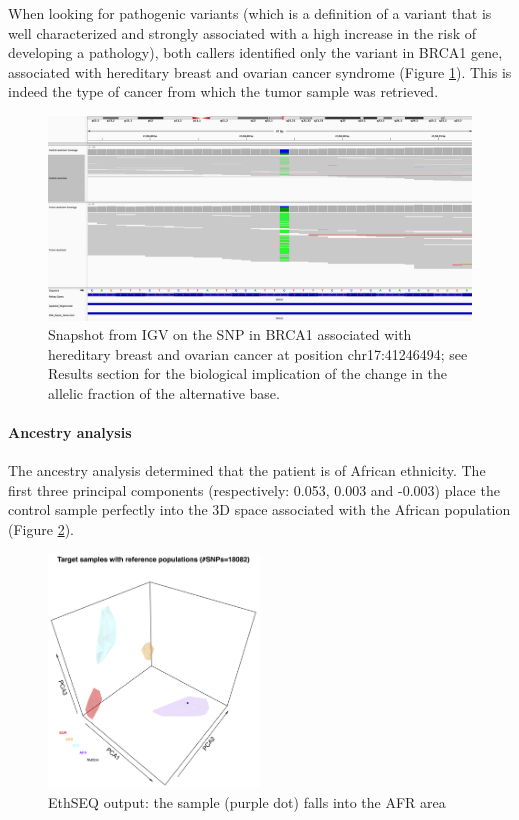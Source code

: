 \documentclass[11pt]{article}
\begin{document}
When looking for pathogenic variants (which is a definition of a variant that is well characterized and strongly associated with a high increase in the risk of developing a pathology), both callers identified only the variant in BRCA1 gene, associated with hereditary breast and ovarian cancer syndrome (Figure \ref{igv_BRCA1}). This is indeed the type of cancer from which the tumor sample was retrieved.

\begin{figure}[H]
   \centering
   \includegraphics[width=\textwidth]{images/BRCA1_snp_het_del.png}
   \caption{\footnotesize{Snapshot from IGV on the SNP in BRCA1 associated with hereditary breast and ovarian cancer at position chr17:41246494; see Results section for the biological implication of the change in the allelic fraction of the alternative base.}}
   \label{igv_BRCA1}
\end{figure}


\paragraph{Ancestry analysis}
The ancestry analysis determined that the patient is of African ethnicity. The first three principal components (respectively: 0.053, 0.003 and -0.003) place the control sample perfectly into the 3D space associated with the African population (Figure \ref{ethSEQ}).

\begin{figure}[H]
   \centering
   \includegraphics[width=0.5\textwidth]{images/EthSEQ_out.png}
   \caption{\footnotesize{EthSEQ output: the sample (purple dot) falls into the AFR area}}
   \label{ethSEQ}
\end{figure}
\end{document}

